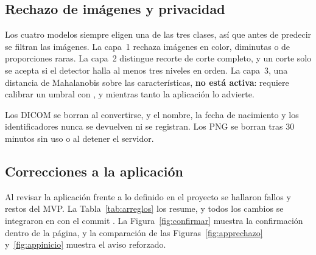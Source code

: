 \subsection{Rechazo de imágenes y privacidad}
Los cuatro modelos siempre eligen una de las tres clases, así que antes de predecir se filtran las imágenes. La capa~1 rechaza imágenes en color, diminutas o de proporciones raras. La capa~2 distingue recorte de corte completo, y un corte solo se acepta si el detector halla al menos tres niveles en orden. La capa~3, una distancia de Mahalanobis sobre las características, \textbf{no está activa}: requiere calibrar un umbral con , y mientras tanto la aplicación lo advierte.

Los DICOM se borran al convertirse, y el nombre, la fecha de nacimiento y los identificadores nunca se devuelven ni se registran. Los PNG se borran tras 30 minutos sin uso o al detener el servidor.

\subsection{Correcciones a la aplicación}
\label{sec:arreglos}
Al revisar la aplicación frente a lo definido en el proyecto se hallaron fallos y restos del MVP. La Tabla~\ref{tab:arreglos} los resume, y todos los cambios se integraron en  con el commit . La Figura~\ref{fig:confirmar} muestra la confirmación dentro de la página, y la comparación de las Figuras~\ref{fig:apprechazo} y~\ref{fig:appinicio} muestra el aviso reforzado.

